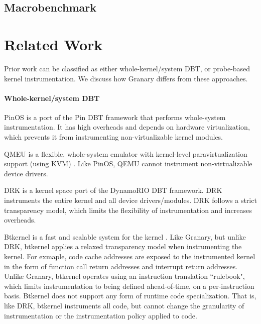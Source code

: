 \documentclass[preprint]{sigplanconf}
\newcommand{\toolname}[1]{{\scshape #1}}
\begin{document}
\subsection{Macrobenchmark}\label{sec:macrobenchmark}




\section{Related Work}\label{sec:related}
Prior work can be classified as either whole-kernel/system DBT, or probe-based kernel instrumentation. We discuss how Granary differs from these approaches.
\paragraph{Whole-kernel/system DBT}
PinOS \cite{PinOS} is a port of the Pin \cite{Pin} DBT framework that performs whole-system instrumentation. It has high overheads and depends on hardware virtualization, which prevents it from instrumenting non-virtualizable kernel modules. 

QMEU is a flexible, whole-system emulator with kernel-level paravirtualization support (using KVM) \cite{QEMU}. Like PinOS, QEMU cannot instrument non-virtualizable device drivers.

DRK \cite{DRK} is a kernel space port of the DynamoRIO \cite{DynamoRIO} DBT framework. DRK instruments the entire kernel and all device drivers/modules. DRK follows a strict transparency model, which limits the flexibility of instrumentation and increases overheads. 

Btkernel is a fast and scalable system for the kernel \cite{btkernel}. Like Granary, but unlike DRK, btkernel applies a relaxed transparency model when instrumenting the kernel. For exmaple, code cache addresses are exposed to the instrumented kernel in the form of function call return addresses and interrupt return addresses. Unlike Granary, btkernel operates using an instruction translation ``rulebook", which limits instrumentation to being defined ahead-of-time, on a per-instruction basis. Btkernel does not support any form of runtime code specialization. That is, like DRK, btkernel instruments all code, but cannot change the granularity of instrumentation or the instrumentation policy applied to code.
\end{document}
